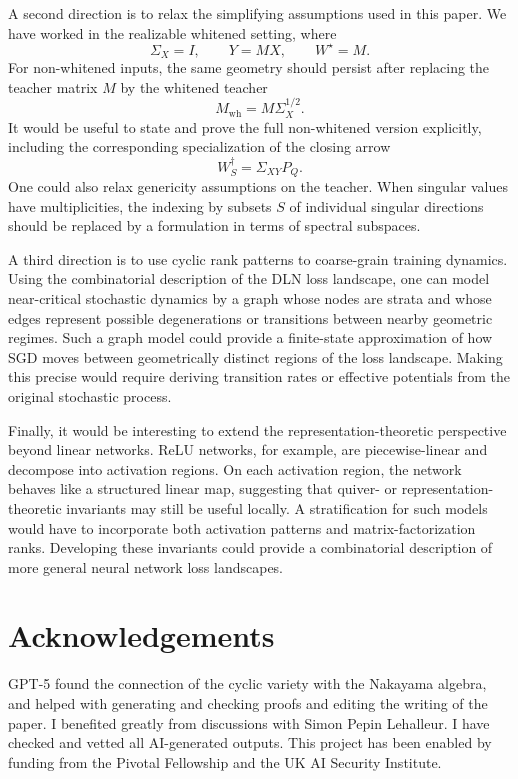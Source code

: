 \documentclass[11pt]{article}
\theoremstyle{definition}
\begin{document}
A second direction is to relax the simplifying assumptions used in this paper.
We have worked in the realizable whitened setting, where
\[
\Sigma_X=I,
\qquad
Y=MX,
\qquad
W^\star=M.
\]
For non-whitened inputs, the same geometry should persist after replacing the
teacher matrix \(M\) by the whitened teacher
\[
M_{\mathrm{wh}}=M\Sigma_X^{1/2}.
\]
It would be useful to state and prove the full non-whitened version explicitly,
including the corresponding specialization of the closing arrow
\[
W_S^{\dagger}=\Sigma_{XY}P_Q.
\]
One could also relax genericity assumptions on the teacher. When singular
values have multiplicities, the indexing by subsets \(S\) of individual
singular directions should be replaced by a formulation in terms of spectral
subspaces.

A third direction is to use cyclic rank patterns to coarse-grain training
dynamics. Using the combinatorial description of the DLN loss landscape,
one can model near-critical stochastic dynamics by a graph whose nodes are
strata and whose edges represent possible degenerations or transitions between
nearby geometric regimes. Such a graph model could provide a finite-state approximation of how
SGD moves between geometrically distinct regions of the loss landscape. Making
this precise would require deriving transition rates or effective potentials
from the original stochastic process.

Finally, it would be interesting to extend the representation-theoretic
perspective beyond linear networks. ReLU networks, for example, are
piecewise-linear and decompose into activation regions. On each activation
region, the network behaves like a structured linear map, suggesting that
quiver- or representation-theoretic invariants may still be useful locally. A
stratification for such models would have to incorporate both activation
patterns and matrix-factorization ranks. Developing these invariants could
provide a combinatorial description of more general neural network loss
landscapes.
\section{Acknowledgements}
GPT-5 found the connection of the cyclic variety with the Nakayama algebra, and helped with generating and checking proofs and editing the writing of the paper. I benefited greatly from discussions with Simon Pepin Lehalleur. I have checked and vetted all AI-generated outputs. This project has been enabled by funding from the Pivotal Fellowship and the UK AI Security Institute.

\end{document}
